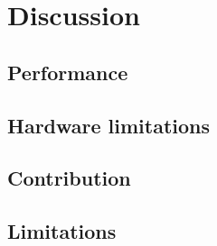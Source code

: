 \chapter{Discussion}



\section{Performance}\label{chap:discussperformance}

\section{Hardware limitations}


\section{Contribution}

\section{Limitations}
